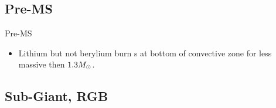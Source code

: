 \subsection{Pre-MS}

\begin{frame}{Pre-MS}
    \begin{itemize}
        \item Lithium but not berylium burn s at bottom of convective zone for less massive then $1.3M_{\odot}{}$.
    \end{itemize}
\end{frame}

\subsection{Sub-Giant, RGB}

